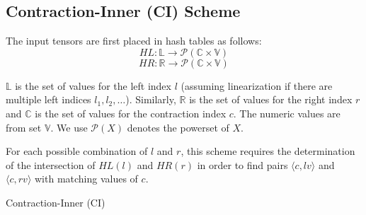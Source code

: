 \subsection{Contraction-Inner (CI) Scheme } 
The input tensors are first placed in hash tables as follows:
$$\mathit{HL}: \mathbb{L} \rightarrow \mathcal{P}(\mathbb{C} \times \mathbb{V})$$
$$\mathit{HR}: \mathbb{R} \rightarrow \mathcal{P}(\mathbb{C} \times \mathbb{V})$$

$\mathbb{L}$ is the set of values for the left index $l$ (assuming linearization if there are multiple left indices $l_1, l_2, \ldots$). Similarly, $\mathbb{R}$ is the set of values for the right index $r$ and $\mathbb{C}$ is the set of values for the contraction index $c$. The numeric values are from set $\mathbb{V}$. We use $\mathcal{P}(X)$ denotes the powerset of $X$. 

For each possible combination of $l$ and $r$, this scheme requires the determination of the intersection of $\mathit{HL}(l)$ and $\mathit{HR}(r)$ in order to find pairs $\langle c,\mathit{lv} \rangle$ and $\langle c,\mathit{rv} \rangle$ with matching values of $c$. 

\begin{algorithm}[h]
\DontPrintSemicolon
\LinesNumbered
{}
\caption{Contraction-Inner (CI)\label{algo:ci}}
\end{algorithm}

